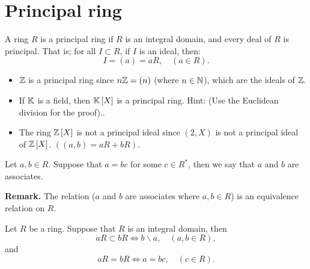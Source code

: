 \section{Principal ring}
\begin{definition}[]
A ring $R$ is a principal ring if $R$ is an integral domain, and
every deal of $R$ is principal. That is; for all $I \subset R$, 
if $I$ is an ideal, then:
\[
I = \left( a \right)  = a R, \quad (a \in  R).
\]
\end{definition}
\begin{example}
  \begin{itemize}
    \item [\ding{172} ] $\mathbb{Z}$ is a principal ring 
      since $n \mathbb{Z} = (n)$ (where $n \in  \mathbb{N}$), which are
      the ideals of $\mathbb{Z}.$ 
    \item [\ding{173} ] If $\mathbb{K}$ is a field, then 
      $\mathbb{K} \left[ X \right]$ is a principal ring. 
      Hint: (Use 
      the Euclidean division for the proof).\normalfont.
    \item [\ding{174} ] 
      The ring $\mathbb{Z}\left[ X \right]$ is not a principal ideal 
      since $(2, X) $ is not a principal ideal of $\mathbb{Z} \left[ X \right]$. 
      $\left( (a,b) = a R + b R \right) $.
  \end{itemize}
\end{example}
\begin{definition}[]
Let $a, b \in  R$. Suppose that $a = b c$ for some $c \in  R^{*}$,
then we say that $a$ and $b$ are associates.
\end{definition}
\noindent\textbf{Remark. }The relation ($a$ and $b$ are associates where $a, b \in  R$)
is an equivalence relation on $R$.
\begin{proposition}[]
  Let $R$ be a ring. Suppose that $R$ is an integral domain, then
  \[
    a R \subset b R \iff b \backslash  a, \quad 
    (a, b \in  R),
  \]
  and
  \[
    a R = b R \iff a = b c, \quad (c \in  R).
  \]
\end{proposition}
